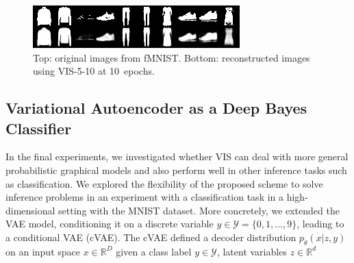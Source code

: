 \unskip
\begin{figure}[h]

\includegraphics[width=\linewidth]{img/reconstruction_mnist_gauss8_5_10_0_.png}

  \caption{Top: original images from fMNIST. Bottom: reconstructed images using VIS-5-10 at 10~epochs.}\label{fig:reco2}
\end{figure}

\subsection{Variational Autoencoder as a Deep Bayes Classifier}\label{sec:exp}
In the final experiments, we investigated whether VIS can deal with more general probabilistic graphical models and also perform well in other inference tasks such as classification.
We explored the flexibility of the proposed scheme to solve inference problems in an experiment with a classification task in a high-dimensional setting %
with the MNIST dataset.
More concretely, we extended the VAE model, conditioning it on a discrete variable $y \in \mathcal{Y} = \lbrace 0, 1, \ldots, 9 \rbrace$, leading to a conditional VAE (cVAE). The cVAE defined a decoder distribution $p_\theta(x | z, y)$ on an input space $x \in \mathbb{R}^D$ given a class label $y \in \mathcal{Y}$, latent variables $z \in \mathbb{R}^d$ 


